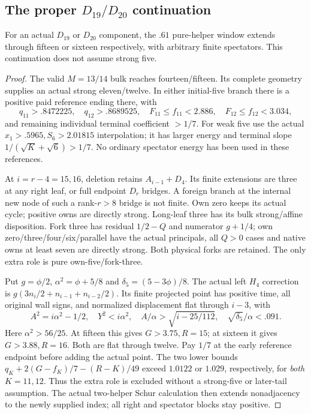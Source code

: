 \subsection{The proper $D_{19}/D_{20}$ continuation}
\label{app:tail:properD1920}
\begin{lemma}
\label{app:tail:lem:D4proper}
For an actual $D_{19}$ or $D_{20}$ component, the $.61$ pure-helper
window extends through fifteen or sixteen respectively, with arbitrary
finite spectators. This continuation does not assume strong five.
\end{lemma}
\begin{proof}
The valid $M=13/14$ bulk reaches fourteen/fifteen. Its complete
geometry supplies an actual strong eleven/twelve. In either initial-five
branch there is a positive paid reference ending there, with
\[
 q_{11}>.8472225,\quad q_{12}>.8689525,\quad
 F_{11}\le f_{11}<2.886,\quad F_{12}\le f_{12}<3.034,
\]
and remaining individual terminal coefficient $>1/7$.
For weak five use the actual $x_1>.5965,S_6>2.01815$ interpolation;
it has larger energy and terminal slope $1/(\sqrt K+\sqrt6)>1/7$.
No ordinary spectator energy has been used in these references.

At $i=r-4=15,16$, deletion retains $A_{i-1}+D_4$.
Its finite extensions are three at any right leaf, or full endpoint
$D_r$ bridges. A foreign branch at the internal new node of such a
rank-$r>8$ bridge is not finite. Own zero keeps its actual cycle;
positive owns are directly strong. Long-leaf three has its bulk
strong/affine disposition. Fork three has residual $1/2-Q$ and
numerator $g+1/4$; own zero/three/four/six/parallel have the actual
principals, all $Q>0$ cases and native owns at least seven are
directly strong. Both physical forks are retained. The only extra
role is pure own-five/fork-three.

Put $g=\phi/2$, $\alpha^2=\phi+5/8$ and
$\delta_5=(5-3\phi)/8$. The actual left $H_4$ correction is
$g(3n_i/2+n_{i-1}+n_{i-2}/2)$. Its finite projected point has
positive time, all original wall signs, and normalized displacement
flat through $i-3$, with
\[
 A^2=i\alpha^2-1/2,\quad Y^2<i\alpha^2,\quad
 A/\alpha>\sqrt{i-25/112},\quad
 \sqrt{\delta_5}/\alpha<.091.
\]
Here $\alpha^2>56/25$. At fifteen this gives $G>3.75,R=15$;
at sixteen it gives $G>3.88,R=16$. Both are flat through twelve.
Pay $1/7$ at the early reference endpoint before adding the actual
point. The two lower bounds
$q_K+2(G-f_K)/7-(R-K)/49$ exceed $1.0122$ or $1.029$,
respectively, for \emph{both} $K=11,12$. Thus the extra role is
excluded without a strong-five or later-tail assumption.
The actual two-helper Schur calculation then extends nonadjacency
to the newly supplied index; all right and spectator blocks stay positive.
\end{proof}


